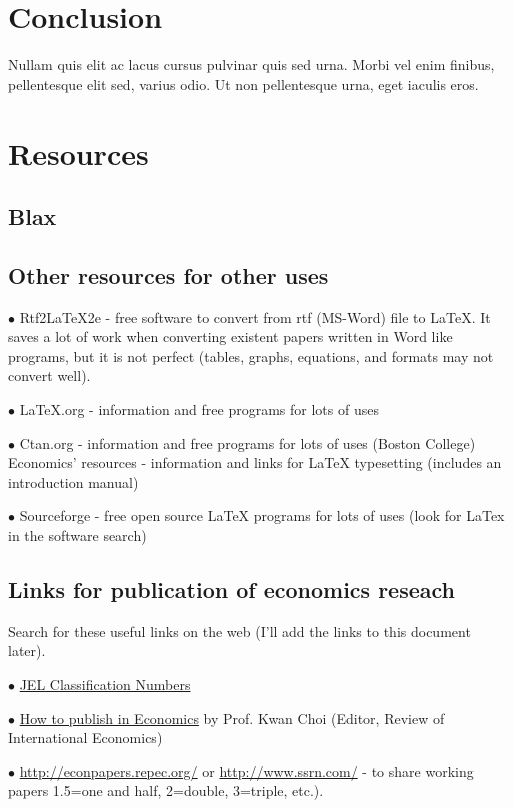 \documentclass[12pt]{article}%
\begin{document}
\section{Conclusion}

Nullam quis elit ac lacus cursus pulvinar quis sed urna. Morbi vel enim finibus, pellentesque elit sed, varius odio. Ut non pellentesque urna, eget iaculis eros.

\section{Resources}

\subsection{Blax}

\subsection{Other resources for other uses}

$\bullet$ Rtf2LaTeX2e - free software to convert from rtf (MS-Word) file to LaTeX. It saves a lot of work when converting existent papers written in Word like programs, but it is not perfect (tables, graphs, equations, and formats may not convert well).

$\bullet$ LaTeX.org - information and free programs for lots of uses

$\bullet$ Ctan.org - information and free programs for lots of uses
(Boston College) Economics' resources - information and links for LaTeX typesetting (includes an introduction manual)

$\bullet$ Sourceforge - free open source LaTeX programs for lots of uses (look for LaTex in the software search)

\subsection{Links for publication of economics reseach}

Search for these useful links on the web (I'll add the links to this document later).

$\bullet$
\href{http://www.aeaweb.org/journal/jel_class_system.php}{JEL Classification Numbers}


$\bullet$
\href{http://www.roie.org/howi.htm}{How to publish in Economics} by Prof. Kwan Choi (Editor, Review of International Economics)

$\bullet$
\href{http://econpapers.repec.org/}{http://econpapers.repec.org/} or \href{http://www.ssrn.com/}{http://www.ssrn.com/}  - to share working papers
1.5=one and half, 2=double, 3=triple, etc.).
\end{document}
